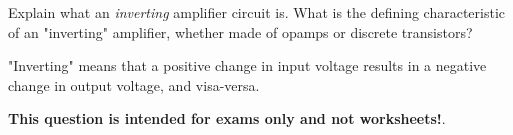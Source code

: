 

Explain what an {\it inverting} amplifier circuit is.  What is the defining characteristic of an "inverting" amplifier, whether made of opamps or discrete transistors?







"Inverting" means that a positive change in input voltage results in a negative change in output voltage, and visa-versa.







{\bf This question is intended for exams only and not worksheets!}.




